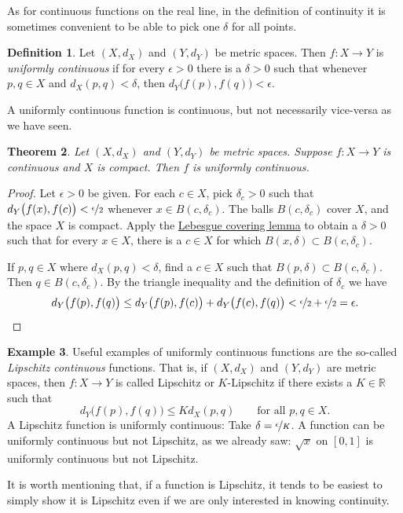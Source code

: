 \documentclass[12pt,openany]{book}
\newcommand{\R}{{\mathbb{R}}}
\theoremstyle{plain}
\newtheorem{thm}{Theorem}[section]
\theoremstyle{remark}
\theoremstyle{definition}
\newtheorem{defn}[thm]{Definition}
\theoremstyle{exercise}
\theoremstyle{example}
\newtheorem{example}[thm]{Example}
\begin{document}
As for continuous
functions on the real line, in the definition of continuity
it is sometimes convenient to be able to pick
one $\delta$ for all points.

\begin{defn}
Let $(X,d_X)$ and $(Y,d_Y)$ be metric spaces.
Then $f \colon X \to Y$ is
\emph{uniformly continuous}
if for every $\epsilon > 0$
there is a $\delta > 0$ such that whenever $p,q \in X$ and $d_X(p,q) <
\delta$, then
$d_Y\bigl(f(p),f(q)\bigr) < \epsilon$.
\end{defn}

A uniformly continuous function is continuous, but not necessarily
vice-versa as we have seen.

\begin{thm} \label{thm:Xcompactfunifcont}
Let $(X,d_X)$ and $(Y,d_Y)$ be metric spaces.
Suppose $f \colon X \to Y$ is continuous and $X$ is compact.  Then
$f$ is uniformly continuous.
\end{thm}

\begin{proof}
Let $\epsilon > 0$ be given.  For each $c \in X$, pick $\delta_c > 0$ such that
$d_Y\bigl(f(x),f(c)\bigr) < \nicefrac{\epsilon}{2}$
whenever
$x \in B(c,\delta_c)$.
The balls
$B(c,\delta_c)$ cover $X$, and the space $X$ is compact.  
Apply the \hyperref[ms:lebesgue]{Lebesgue covering lemma} to obtain a 
$\delta > 0$ such that for every $x \in X$, there is a $c \in X$
for which $B(x,\delta) \subset B(c,\delta_c)$.

If $p, q \in X$ where $d_X(p,q) < \delta$,
find a $c \in X$ such that $B(p,\delta) \subset B(c,\delta_c)$.
Then $q \in B(c,\delta_c)$.  By the triangle inequality
and the definition of $\delta_c$ we have
\begin{equation*}
d_Y\bigl(f(p),f(q)\bigr)
\leq
d_Y\bigl(f(p),f(c)\bigr)
+
d_Y\bigl(f(c),f(q)\bigr)
<
\nicefrac{\epsilon}{2}+
\nicefrac{\epsilon}{2} = \epsilon .  \qedhere
\end{equation*}
\end{proof}


\begin{example}
Useful examples of uniformly continuous functions are the so-called
\emph{Lipschitz continuous}%
%
functions.  That is, if
$(X,d_X)$ and $(Y,d_Y)$ are metric spaces, then $f \colon X \to Y$
is called Lipschitz or $K$-Lipschitz if there exists a $K \in \R$ such that
\begin{equation*}
d_Y\bigl(f(p),f(q)\bigr) \leq K d_X(p,q)
\qquad \text{for all } p,q \in X.
\end{equation*}
A Lipschitz function is uniformly continuous:
Take $\delta = \nicefrac{\epsilon}{K}$.
A function can be uniformly continuous
but not Lipschitz,
as we already saw: $\sqrt{x}$ on $[0,1]$
is uniformly continuous but not Lipschitz.

It is worth mentioning that,
if a function is Lipschitz, it tends to be
easiest to simply show it is Lipschitz even if we are only
interested in knowing continuity.
\end{example}
\end{document}
